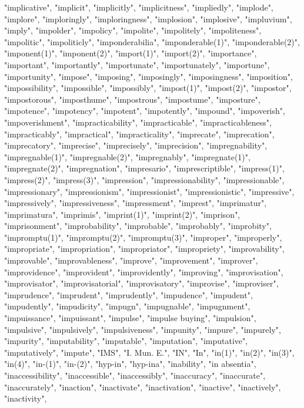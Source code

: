 "implicative",
"implicit",
"implicitly",
"implicitness",
"impliedly",
"implode",
"implore",
"imploringly",
"imploringness",
"implosion",
"implosive",
"impluvium",
"imply",
"impolder",
"impolicy",
"impolite",
"impolitely",
"impoliteness",
"impolitic",
"impoliticly",
"imponderabilia",
"imponderable(1)",
"imponderable(2)",
"imponent(1)",
"imponent(2)",
"import(1)",
"import(2)",
"importance",
"important",
"importantly",
"importunate",
"importunately",
"importune",
"importunity",
"impose",
"imposing",
"imposingly",
"imposingness",
"imposition",
"impossibility",
"impossible",
"impossibly",
"impost(1)",
"impost(2)",
"impostor",
"impostorous",
"imposthume",
"impostrous",
"impostume",
"imposture",
"impotence",
"impotency",
"impotent",
"impotently",
"impound",
"impoverish",
"impoverishment",
"impracticability",
"impracticable",
"impracticableness",
"impracticably",
"impractical",
"impracticality",
"imprecate",
"imprecation",
"imprecatory",
"imprecise",
"imprecisely",
"imprecision",
"impregnability",
"impregnable(1)",
"impregnable(2)",
"impregnably",
"impregnate(1)",
"impregnate(2)",
"impregnation",
"impresario",
"imprescriptible",
"impress(1)",
"impress(2)",
"impress(3)",
"impression",
"impressionability",
"impressionable",
"impressionary",
"impressionism",
"impressionist",
"impressionistic",
"impressive",
"impressively",
"impressiveness",
"impressment",
"imprest",
"imprimatur",
"imprimatura",
"imprimis",
"imprint(1)",
"imprint(2)",
"imprison",
"imprisonment",
"improbability",
"improbable",
"improbably",
"improbity",
"impromptu(1)",
"impromptu(2)",
"impromptu(3)",
"improper",
"improperly",
"impropriate",
"impropriation",
"impropriator",
"impropriety",
"improvability",
"improvable",
"improvableness",
"improve",
"improvement",
"improver",
"improvidence",
"improvident",
"improvidently",
"improving",
"improvisation",
"improvisator",
"improvisatorial",
"improvisatory",
"improvise",
"improviser",
"imprudence",
"imprudent",
"imprudently",
"impudence",
"impudent",
"impudently",
"impudicity",
"impugn",
"impugnable",
"impugnment",
"impuissance",
"impuissant",
"impulse",
"impulse buying",
"impulsion",
"impulsive",
"impulsively",
"impulsiveness",
"impunity",
"impure",
"impurely",
"impurity",
"imputability",
"imputable",
"imputation",
"imputative",
"imputatively",
"impute",
"IMS",
"I. Mun. E.",
"IN",
"In",
"in(1)",
"in(2)",
"in(3)",
"in(4)",
"in-(1)",
"in-(2)",
"hyp-in",
"hyp-ina",
"inability",
"in absentia",
"inaccessibility",
"inaccessible",
"inaccessibly",
"inaccuracy",
"inaccurate",
"inaccurately",
"inaction",
"inactivate",
"inactivation",
"inactive",
"inactively",
"inactivity",
